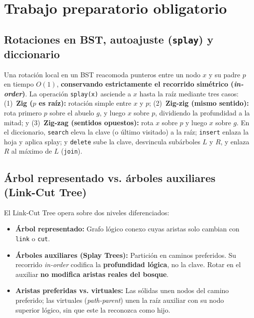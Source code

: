 \section{Trabajo preparatorio obligatorio}

\subsection{Rotaciones en BST, autoajuste (\texttt{splay}) y diccionario}
Una rotación local en un BST reacomoda punteros entre un nodo $x$ y su padre $p$ en tiempo $O(1)$, \textbf{conservando estrictamente el recorrido simétrico (\textit{in-order})}. La operación \texttt{splay(x)} asciende a $x$ hasta la raíz mediante tres casos:
(1)~\textbf{Zig ($p$ es raíz):} rotación simple entre $x$ y $p$;
(2)~\textbf{Zig-zig (mismo sentido):} rota primero $p$ sobre el abuelo $g$, y luego $x$ sobre $p$, dividiendo la profundidad a la mitad; y
(3)~\textbf{Zig-zag (sentidos opuestos):} rota $x$ sobre $p$ y luego $x$ sobre $g$.
En el diccionario, \texttt{search} eleva la clave (o último visitado) a la raíz; \texttt{insert} enlaza la hoja y aplica splay; y \texttt{delete} sube la clave, desvincula subárboles $L$ y $R$, y enlaza $R$ al máximo de $L$ (\texttt{join}).

\subsection{Árbol representado vs. árboles auxiliares (Link-Cut Tree)}
El Link-Cut Tree opera sobre dos niveles diferenciados:
\begin{itemize}\setlength\itemsep{0pt}\setlength\parskip{0pt}
    \item \textbf{Árbol representado:} Grafo lógico conexo cuyas aristas solo cambian con \texttt{link} o \texttt{cut}.
    \item \textbf{Árboles auxiliares (Splay Trees):} Partición en caminos preferidos. Su recorrido \textit{in-order} codifica la \textbf{profundidad lógica}, no la clave. Rotar en el auxiliar \textbf{no modifica aristas reales del bosque}.
    \item \textbf{Aristas preferidas vs. virtuales:} Las sólidas unen nodos del camino preferido; las virtuales (\textit{path-parent}) unen la raíz auxiliar con su nodo superior lógico, sin que este la reconozca como hijo.
\end{itemize}

